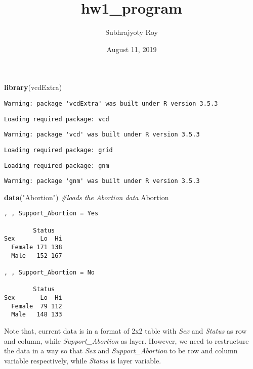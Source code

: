 \documentclass[]{article}
\title{hw1\_program}
\author{Subhrajyoty Roy}
\date{August 11, 2019}
\newenvironment{Shaded}{\begin{snugshade}}{\end{snugshade}}
\newcommand{\KeywordTok}[1]{\textcolor[rgb]{0.13,0.29,0.53}{\textbf{#1}}}
\newcommand{\StringTok}[1]{\textcolor[rgb]{0.31,0.60,0.02}{#1}}
\newcommand{\CommentTok}[1]{\textcolor[rgb]{0.56,0.35,0.01}{\textit{#1}}}
\newcommand{\NormalTok}[1]{#1}
\begin{document}
\maketitle

\begin{Shaded}
\begin{Highlighting}[]
\KeywordTok{library}\NormalTok{(vcdExtra)}
\end{Highlighting}
\end{Shaded}

\begin{verbatim}
Warning: package 'vcdExtra' was built under R version 3.5.3
\end{verbatim}

\begin{verbatim}
Loading required package: vcd
\end{verbatim}

\begin{verbatim}
Warning: package 'vcd' was built under R version 3.5.3
\end{verbatim}

\begin{verbatim}
Loading required package: grid
\end{verbatim}

\begin{verbatim}
Loading required package: gnm
\end{verbatim}

\begin{verbatim}
Warning: package 'gnm' was built under R version 3.5.3
\end{verbatim}

\begin{Shaded}
\begin{Highlighting}[]
\KeywordTok{data}\NormalTok{(}\StringTok{"Abortion"}\NormalTok{)   }\CommentTok{#loads the Abortion data}
\NormalTok{Abortion}
\end{Highlighting}
\end{Shaded}

\begin{verbatim}
, , Support_Abortion = Yes

        Status
Sex       Lo  Hi
  Female 171 138
  Male   152 167

, , Support_Abortion = No

        Status
Sex       Lo  Hi
  Female  79 112
  Male   148 133
\end{verbatim}

Note that, current data is in a format of 2x2 table with \emph{Sex} and
\emph{Status} as row and column, while \emph{Support\_Abortion} as
layer. However, we need to restructure the data in a way so that
\emph{Sex} and \emph{Support\_Abortion} to be row and column variable
respectively, while \emph{Status} is layer variable.
\end{document}
